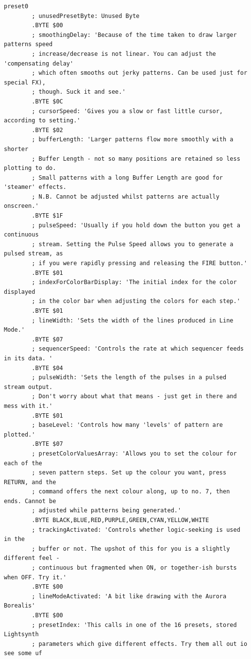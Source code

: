 \begin{lstlisting}[basicstyle=\tiny,caption=Source code for Preset 0.]
preset0
        ; unusedPresetByte: Unused Byte
        .BYTE $00
        ; smoothingDelay: 'Because of the time taken to draw larger patterns speed
        ; increase/decrease is not linear. You can adjust the 'compensating delay'
        ; which often smooths out jerky patterns. Can be used just for special FX),
        ; though. Suck it and see.'
        .BYTE $0C
        ; cursorSpeed: 'Gives you a slow or fast little cursor, according to setting.'
        .BYTE $02
        ; bufferLength: 'Larger patterns flow more smoothly with a shorter
        ; Buffer Length - not so many positions are retained so less plotting to do.
        ; Small patterns with a long Buffer Length are good for 'steamer' effects.
        ; N.B. Cannot be adjusted whilst patterns are actually onscreen.'
        .BYTE $1F
        ; pulseSpeed: 'Usually if you hold down the button you get a continuous
        ; stream. Setting the Pulse Speed allows you to generate a pulsed stream, as
        ; if you were rapidly pressing and releasing the FIRE button.'
        .BYTE $01
        ; indexForColorBarDisplay: 'The initial index for the color displayed
        ; in the color bar when adjusting the colors for each step.'
        .BYTE $01
        ; lineWidth: 'Sets the width of the lines produced in Line Mode.'
        .BYTE $07
        ; sequencerSpeed: 'Controls the rate at which sequencer feeds in its data. '
        .BYTE $04
        ; pulseWidth: 'Sets the length of the pulses in a pulsed stream output.
        ; Don't worry about what that means - just get in there and mess with it.'
        .BYTE $01
        ; baseLevel: 'Controls how many 'levels' of pattern are plotted.'
        .BYTE $07
        ; presetColorValuesArray: 'Allows you to set the colour for each of the
        ; seven pattern steps. Set up the colour you want, press RETURN, and the
        ; command offers the next colour along, up to no. 7, then ends. Cannot be
        ; adjusted while patterns being generated.'
        .BYTE BLACK,BLUE,RED,PURPLE,GREEN,CYAN,YELLOW,WHITE
        ; trackingActivated: 'Controls whether logic-seeking is used in the
        ; buffer or not. The upshot of this for you is a slightly different feel -
        ; continuous but fragmented when ON, or together-ish bursts when OFF. Try it.'
        .BYTE $00
        ; lineModeActivated: 'A bit like drawing with the Aurora Borealis'
        .BYTE $00
        ; presetIndex: 'This calls in one of the 16 presets, stored Lightsynth
        ; parameters which give different effects. Try them all out io see some uf

\end{lstlisting}
